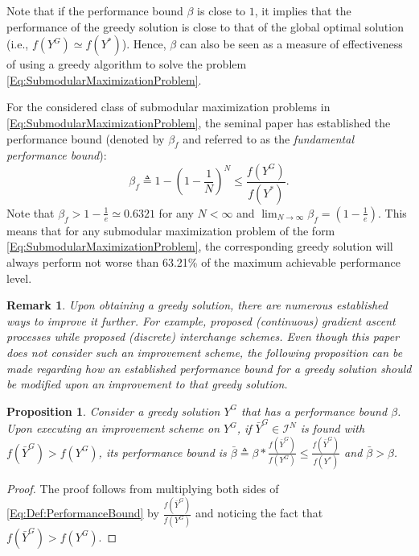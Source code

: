 \documentclass[conference]{IEEEtran}
\newtheorem{proposition}{Proposition}
\newtheorem{remark}{Remark}
\begin{document}
Note that if the performance bound $\beta$ is close to $1$, it implies that the performance of the greedy solution is close to that of the global optimal solution (i.e., $f(Y^G)\simeq f(Y^*)$). Hence, $\beta$ can also be seen as a measure of effectiveness of using a greedy algorithm to solve the problem \eqref{Eq:SubmodularMaximizationProblem}. 

For the considered class of submodular maximization problems in \eqref{Eq:SubmodularMaximizationProblem}, the seminal paper \cite{Nemhauser1978} has established the performance bound (denoted by $\beta_f$ and referred to as the \emph{fundamental performance bound}):
\begin{equation}\label{Eq:FundamentalPerformanceBound}
    \beta_f \triangleq 1-\left(1-\frac{1}{N}\right)^N \leq \frac{f(Y^G)}{f(Y^*)}.
\end{equation}
Note that $\beta_f > 1-\frac{1}{e} \simeq 0.6321$ for any $N<\infty$ and $\lim_{N\rightarrow\infty} \beta_f = (1-\frac{1}{e})$. This means that for any submodular maximization problem of the form \eqref{Eq:SubmodularMaximizationProblem}, the corresponding greedy solution will always perform not worse than 63.21\% of the maximum achievable performance level.


\begin{remark}\label{Rm:Improvements}
Upon obtaining a greedy solution, there are numerous established ways to improve it further. For example, \cite{Sun2019,Sun2020} proposed (continuous) gradient ascent processes while \cite{Nemhauser1978,Welikala2019P3} proposed (discrete) interchange schemes. Even though this paper does not consider such an improvement scheme, the following proposition can be made regarding how an established performance bound for a greedy solution should be modified upon an improvement to that greedy solution. 
\end{remark}


\begin{proposition}\label{Prop:Improvement}
Consider a greedy solution $Y^G$ that has a performance bound $\beta$. Upon executing an improvement scheme on $Y^G$, 
if $\bar{Y}^G\in \mathcal{I}^N$ is found with $f(\bar{Y}^G) > f(Y^G)$, its performance bound is $\bar{\beta} \triangleq \beta * \frac{f(\bar{Y}^G)}{f(Y^G)} \leq \frac{f(\bar{Y}^G)}{f(Y^*)}$ and $\bar{\beta}>\beta$. 
\end{proposition}

\begin{proof}
The proof follows from multiplying both sides of \eqref{Eq:Def:PerformanceBound} by $\frac{f(\bar{Y}^G)}{f(Y^G)}$ and noticing the fact that $f(\bar{Y}^G)>f(Y^G)$.  
\end{proof}
\end{document}
